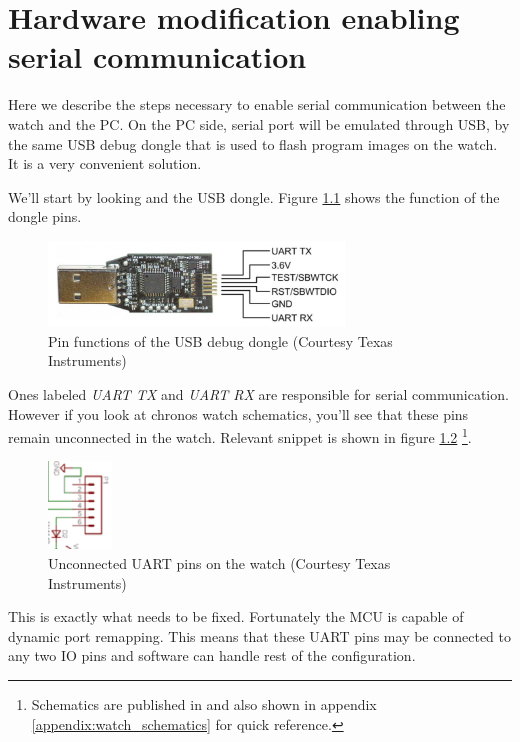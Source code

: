 \appendix
\chapter{Hardware modification enabling serial communication}
\label{appendix:uard_pins}

Here we describe the steps necessary to enable serial communication
between the watch and the PC. On the PC side, serial port will be
emulated through USB, by the same USB debug dongle that is used to
flash program images on the watch. It is a very convenient solution.

We'll start by looking and the USB dongle. Figure
\ref{fig:chronos_dongle_pins} shows the function of the dongle pins.
\begin{figure}[h]
  \centering
  \includegraphics[width=0.7\textwidth]{img/chronos_dongle_pins.png}
  \caption{Pin functions of the USB debug dongle (Courtesy Texas Instruments)}
  \label{fig:chronos_dongle_pins}
\end{figure}
Ones labeled \emph{UART TX} and \emph{UART RX} are responsible for
serial communication. However if you look at chronos watch schematics,
you'll see that these pins remain unconnected in the watch. Relevant
snippet is shown in figure \ref{fig:chronos_unonnected_uart}
\footnote{Schematics are published in \cite{eZ430Chronos} and also
shown in appendix \ref{appendix:watch_schematics} for quick
reference.}.
\begin{figure}[h]
  \centering
  \includegraphics[width=0.15\textwidth]{img/chronos_unonnected_uart.png}
  \caption{Unconnected UART pins on the watch (Courtesy Texas Instruments)}
  \label{fig:chronos_unonnected_uart}
\end{figure}
This is exactly what needs to be fixed. Fortunately the MCU is capable
of dynamic port remapping. This means that these UART pins may be
connected to any two IO pins and software can handle rest of the
configuration.

